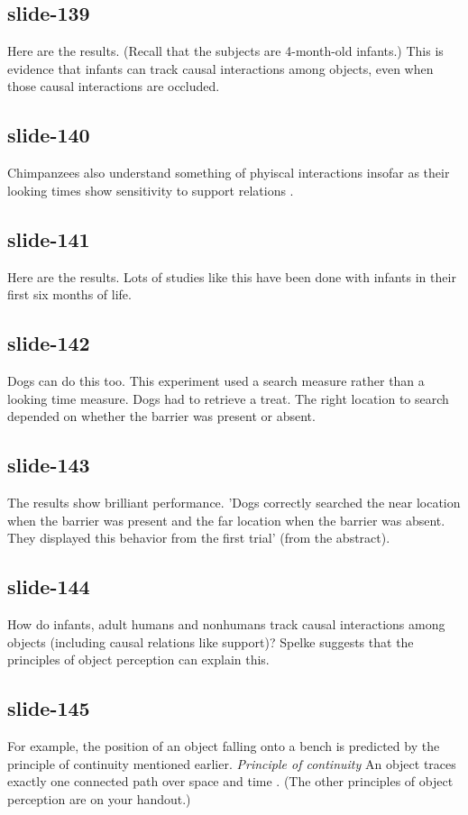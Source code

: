 \documentclass[12pt,\papersize]{extarticle}
\begin{document}
 
\subsection{slide-139}
Here are the results.
(Recall that the subjects are 4-month-old infants.)
This is evidence that infants can track causal interactions among objects, even when those causal interactions are occluded.
 
 
\subsection{slide-140}
Chimpanzees also understand something of phyiscal interactions insofar as their looking times show sensitivity to support relations \citep{cacchione:2004_recognizing}.
 
 
\subsection{slide-141}
Here are the results.
Lots of studies like this have been done with infants in their first six months of life.
 
 
\subsection{slide-142}
Dogs can do this too.
This experiment used a search measure rather than a looking time measure.
Dogs had to retrieve a treat. The right location to search depended on whether the barrier was present or absent.
 
 
\subsection{slide-143}
The results show brilliant performance.
'Dogs correctly searched the near location when the barrier was present and the far location when the barrier was absent. They displayed this behavior from the first trial' \citep{kundey:2010_domesticated} (from the abstract).
 
 
\subsection{slide-144}
How do infants, adult humans and nonhumans track causal interactions among objects (including causal relations like support)?
Spelke suggests that the principles of object perception can explain this.
 
 
\subsection{slide-145}
For example, the position of an object falling onto a bench is predicted by the principle of continuity mentioned earlier.
\emph{Principle of continuity} An object traces exactly one connected path over space and time \citep[p.\ 113]{spelke:1995_spatiotemporal}.
(The other principles of object perception are on your handout.)
 
\end{document}
